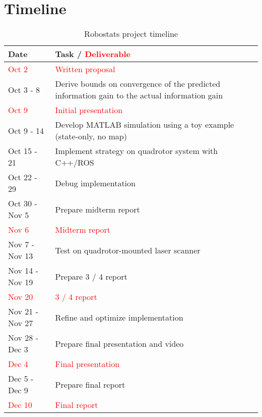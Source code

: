 \section{Timeline}

\begin{table}[!ht]
  \centering
  \begin{tabular}{|l|p{13.5 cm} | } \hline
    \textbf{Date} & \textbf{Task / \textcolor{red}{Deliverable}} \\ \hline
            \textcolor{red}{Oct 2} & \textcolor{red}{Written proposal} \\ \hline
            Oct 3 - 8 & Derive bounds on convergence of the predicted information gain to the actual information gain \\ \hline
            \textcolor{red}{Oct 9} & \textcolor{red}{Initial presentation} \\ \hline
            Oct 9 - 14 & Develop MATLAB simulation using a toy example (state-only, no map) \\ \hline
            Oct 15 - 21 & Implement strategy on quadrotor system with C++/ROS \\ \hline
            Oct 22 - 29 & Debug implementation \\ \hline
            Oct 30 - Nov 5 & Prepare midterm report \\ \hline
            \textcolor{red}{Nov 6} & \textcolor{red}{Midterm report} \\ \hline
            Nov 7 - Nov 13 & Test on quadrotor-mounted laser scanner \\ \hline
            Nov 14 - Nov 19 & Prepare 3 / 4 report \\ \hline
           \textcolor{red}{Nov 20} & \textcolor{red}{3 / 4 report} \\ \hline
             Nov 21 - Nov 27 & Refine and optimize implementation \\ \hline
            Nov 28 - Dec 3 & Prepare final presentation and video \\ \hline
            \textcolor{red}{Dec 4} & \textcolor{red}{Final presentation} \\ \hline
            Dec 5 - Dec 9 & Prepare final report \\ \hline
           \textcolor{red}{Dec 10} & \textcolor{red}{Final report} \\ \hline
  \end{tabular}
  \caption{Robostats project timeline}
  \label{tab:timeline}
\end{table}

